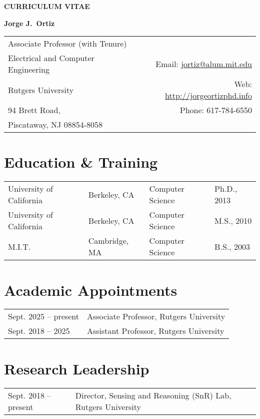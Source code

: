 \documentclass[12pt]{article}
\begin{document}
\pagestyle{CVfooter}

\noindent \textbf{\uppercase{curriculum vitae}}
\vspace{2mm}

\noindent \textbf{Jorge J.\ Ortiz}
\vspace{1mm}

\noindent\begin{tabular*}{\textwidth}{@{\extracolsep{\fill}}l r}
Associate Professor (with Tenure)\\ Electrical and Computer Engineering & Email: \href{mailto:jortiz@alum.mit.edu}{jortiz@alum.mit.edu} \\
Rutgers University & Web: \href{http://jorgeortizphd.info}{http://jorgeortizphd.info} \\
94 Brett Road, & Phone: 617-784-6550 \\
Piscataway, NJ 08854-8058 &  \\
\hline
\end{tabular*}

\section{Education \& Training}

\begin{tabular}{l l l l}
University of California & Berkeley, CA & Computer Science & Ph.D., 2013 \\
University of California & Berkeley, CA & Computer Science & M.S., 2010 \\
M.I.T. & Cambridge, MA & Computer Science & B.S., 2003 \\
\end{tabular}

\section{Academic Appointments}

\begin{tabular}{l l}
Sept. 2025 -- present & Associate Professor, Rutgers University \\
Sept. 2018 -- 2025 & Assistant Professor, Rutgers University \\
\end{tabular}

\section{Research Leadership}

\begin{tabular}{l l}
Sept. 2018 -- present & Director, Sensing and Reasoning (SnR) Lab, Rutgers University \\
\end{tabular}
\end{document}
